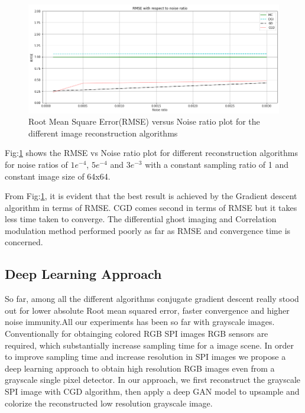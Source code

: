 \documentclass[conference]{IEEEtran}
\begin{document}
\begin{itemize}
    \begin{figure}[ht]
        \centering
        \includegraphics[scale=0.27]{figures/noise_ratio_RMSE.png}
        \caption{Root Mean Square Error(RMSE) versus Noise ratio plot for the different image reconstruction algorithms}
        \label{fig:noise_ratio_RMSE}
        \end{figure}
    \par Fig:\ref{fig:noise_ratio_RMSE} shows the RMSE vs Noise ratio plot for different reconstruction algorithms for noise ratios of \(1{e}^{-4}\), \(5{e}^{-4}\) and \(3{e}^{-3}\) with a constant sampling ratio of 1 and constant image size of 64x64.
    \par From Fig:\ref{fig:noise_ratio_RMSE}, it is evident that the best result is achieved by the Gradient descent algorithm in terms of RMSE. CGD comes second in terms of RMSE but it takes less time taken to converge. The differential ghost imaging and Correlation modulation method performed poorly as far as RMSE and convergence time is concerned.
\end{itemize}



\subsection{Deep Learning Approach}
So far, among all the different algorithms conjugate gradient descent really stood out for lower absolute Root mean squared error, faster convergence and higher noise immunity.All our experiments has been so far with grayscale images. Conventionally for obtainging colored RGB SPI images RGB sensors are required, which substantially increase sampling time for a image scene. In order to improve sampling time and increase resolution in SPI images we propose a deep learning approach to obtain high resolution RGB images even from a grayscale single pixel detector.
In our approach, we first reconstruct the grayscale SPI image with CGD algorithm, then apply a deep GAN model to upsample and colorize the reconstructed low resolution grayscale image.
\end{document}
